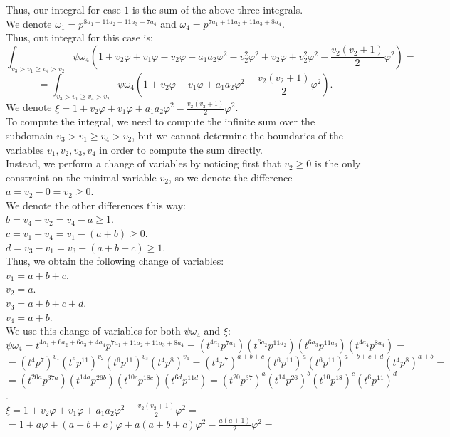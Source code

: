 \documentclass{article}
\begin{document}
Thus, our integral for case $1$ is the sum of the above three integrals.\\
We denote $\omega_1=p^{8a_1+11a_2+11a_3+7a_4}$ and $\omega_4=p^{7a_1+11a_2+11a_3+8a_4}$.\\
Thus, out integral for this case is:
\[\int_{v_3>v_1\geq{v_4}>v_2}\psi\omega_4\left(1+v_2\varphi+v_1\varphi-v_2\varphi+a_1a_2\varphi^2-v_2^2\varphi^2+v_2\varphi+v_2^2\varphi^2-\frac{v_2(v_2+1)}{2}\varphi^2\right)=\]\[=\int_{v_3>v_1\geq{v_4}>v_2}\psi\omega_4\left(1+v_2\varphi+v_1\varphi+a_1a_2\varphi^2-\frac{v_2(v_2+1)}{2}\varphi^2\right).\]
We denote $\xi=1+v_2\varphi+v_1\varphi+a_1a_2\varphi^2-\frac{v_2(v_2+1)}{2}\varphi^2$.\\
To compute the integral, we need to compute the infinite sum over the subdomain $v_3>v_1\geq{v_4}>v_2$, but we cannot determine the boundaries of the variables $v_1,v_2,v_3,v_4$ in order to compute the sum directly.\\ Instead, we perform a change of variables by noticing first that $v_2\geq{0}$ is the only constraint on the minimal variable $v_2$, so we denote the difference $a=v_2-0=v_2\geq{0}$.\\
We denote the other differences this way:\\
$b=v_4-v_2=v_4-a\geq{1}$.\\
$c=v_1-v_4=v_1-(a+b)\geq{0}$.\\
$d=v_3-v_1=v_3-(a+b+c)\geq{1}$.\\
Thus, we obtain the following change of variables:\\
$v_1=a+b+c$.\\
$v_2=a$.\\
$v_3=a+b+c+d$.\\
$v_4=a+b$.\\
We use this change of variables for both $\psi\omega_4$ and $\xi$:\\
$\psi\omega_4=t^{4a_1+6a_2+6a_3+4a_4}{p}^{7a_1+11a_2+11a_3+8a_4}=
(t^{4a_1}p^{7a_1})(t^{6a_2}p^{11a_2})(t^{6a_3}p^{11a_3})(t^{4a_4}p^{8a_4})=$\\$=(t^4p^7)^{v_1}(t^6p^{11})^{v_2}(t^6p^{11})^{v_3}(t^4p^8)^{v_4}=(t^4p^7)^{a+b+c}(t^6p^{11})^{a}(t^6p^{11})^{a+b+c+d}(t^4p^8)^{a+b}=$\\
$=(t^{20a}p^{37a})(t^{14a}p^{26b})(t^{10c}p^{18c})(t^{6d}p^{11d})=(t^{20}p^{37})^a(t^{14}p^{26})^b(t^{10}p^{18})^c(t^{6}p^{11})^d$.\\
$\xi=1+v_2\varphi+v_1\varphi+a_1a_2\varphi^2-\frac{v_2(v_2+1)}{2}\varphi^2=$\\
$=1+a\varphi+(a+b+c)\varphi+a(a+b+c)\varphi^2-\frac{a(a+1)}{2}\varphi^2=$\\
\end{document}
